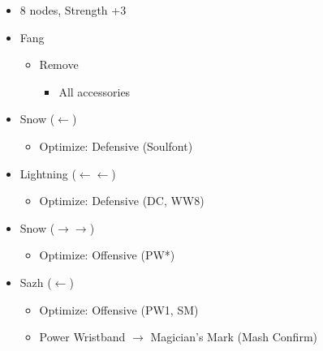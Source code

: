 \begin{menu}
\begin{multicols}{2}
\begin{itemize}
\begin{itemize}
\begin{itemize}
\begin{itemize}
                \item 8 nodes, Strength +3
            \end{itemize}
        \end{itemize}
    \end{itemize}
    \columnbreak
    \equip
    \begin{itemize}
        \item Fang 
        \begin{itemize}
            \item Remove
            \begin{itemize}
                \item All accessories
            \end{itemize}
        \end{itemize}
        \item Snow ($\leftarrow$)
        \begin{itemize}
                \item Optimize: Defensive (Soulfont)
        \end{itemize}
        \item Lightning ($\leftarrow\leftarrow$)
        \begin{itemize}
                \item Optimize: Defensive (DC, WW8)
        \end{itemize}
        \item Snow ($\rightarrow\rightarrow$)
        \begin{itemize}
                \item Optimize: Offensive (PW*)
        \end{itemize}
        \item Sazh ($\leftarrow$)
        \begin{itemize}
                \item Optimize: Offensive (PW1, SM)
                \item Power Wristband $\rightarrow$ Magician's Mark (Mash Confirm)
        \end{itemize}
    \end{itemize}
\end{itemize}
\end{multicols}
\end{menu}

\renewcommand{\first}{[1] Strike Team (\com/\syn/\com)}
\renewcommand{\second}{[2] Tri-Disaster (\rav/\rav/\rav)}
\renewcommand{\third}{[3] Strategic Warfare (\com/\syn/\sen)}
\renewcommand{\fourth}{[4] Tri-Disaster (\rav/\rav/\rav)}
\renewcommand{\fifth}{[5] Cerberus (\com/\com/\com)}
\renewcommand{\sixth}{[6] Cerberus (\com/\com/\com)}

